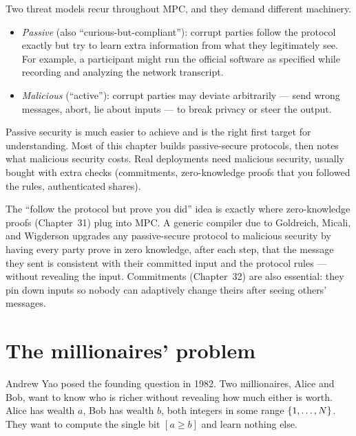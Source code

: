 Two threat models recur throughout MPC, and they demand different machinery.

\begin{itemize}
  \item \emph{Passive} (also ``curious-but-compliant''): corrupt parties follow the protocol exactly but try to learn extra information from what they legitimately see. For example, a participant might run the official software as specified while recording and analyzing the network transcript.
  \item \emph{Malicious} (``active''): corrupt parties may deviate arbitrarily --- send wrong messages, abort, lie about inputs --- to break privacy or steer the output.
\end{itemize}

Passive security is much easier to achieve and is the right first target for understanding. Most of this chapter builds passive-secure protocols, then notes what malicious security costs. Real deployments need malicious security, usually bought with extra checks (commitments, zero-knowledge proofs that you followed the rules, authenticated shares).

\begin{connectionbox}
The ``follow the protocol but prove you did'' idea is exactly where zero-knowledge proofs (Chapter~31) plug into MPC. A generic compiler due to Goldreich, Micali, and Wigderson upgrades any passive-secure protocol to malicious security by having every party prove in zero knowledge, after each step, that the message they sent is consistent with their committed input and the protocol rules --- without revealing the input. Commitments (Chapter~32) are also essential: they pin down inputs so nobody can adaptively change theirs after seeing others' messages.
\end{connectionbox}

\section{The millionaires' problem}
\label{ch34:millionaires}

Andrew Yao posed the founding question in 1982. Two millionaires, Alice and Bob, want to know who is richer without revealing how much either is worth. Alice has wealth $a$, Bob has wealth $b$, both integers in some range $\{1, \dots, N\}$. They want to compute the single bit $[a \ge b]$ and learn nothing else.


